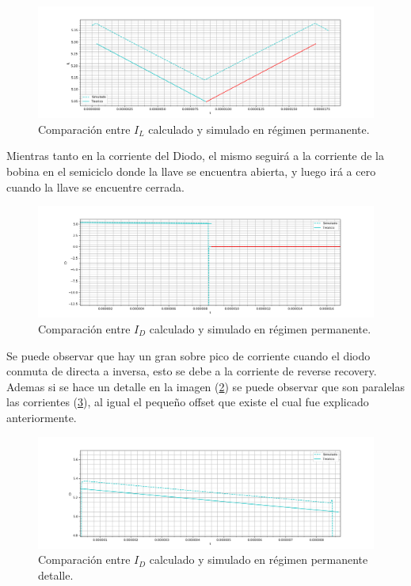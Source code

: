 \begin{figure}[H]
	\centering
	\includegraphics[width=0.8\linewidth]{ImagenesEjercicio-1/il_permanente_sim}
	\caption{Comparación entre $I_L$ calculado y simulado en régimen permanente.}
	\label{ej1:fig:il_permanente_sum}
\end{figure}
Mientras tanto en la corriente del Diodo, el mismo seguirá a la corriente de la bobina en el semiciclo donde la llave se encuentra abierta, y luego irá a cero cuando la llave se encuentre cerrada.
\begin{figure}[H]
	\centering
	\includegraphics[width=0.8\linewidth]{ImagenesEjercicio-1/id_permanente_sim}
	\caption{Comparación entre $I_D$ calculado y simulado en régimen permanente.}
	\label{ej1:fig:id_permanente_sum}
\end{figure}
Se puede observar que hay un gran sobre pico de corriente cuando el diodo conmuta de directa a inversa, esto se debe a la corriente de reverse recovery.
Ademas si se hace un detalle en la imagen (\ref{ej1:fig:id_permanente_sum}) se puede observar que son paralelas las corrientes (\ref{ej1:fig:id_permanente_sum_det}), al igual el pequeño offset que existe el cual fue explicado anteriormente.
\begin{figure}[H]
	\centering
	\includegraphics[width=0.8\linewidth]{ImagenesEjercicio-1/id_permanente_sim_det}
	\caption{Comparación entre $I_D$ calculado y simulado en régimen permanente detalle.}
	\label{ej1:fig:id_permanente_sum_det}
\end{figure}

